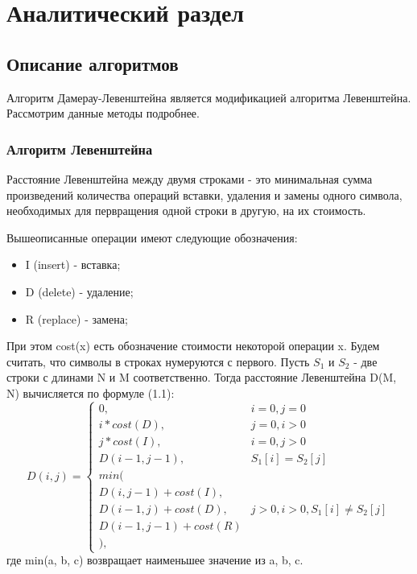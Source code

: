 \chapter{Аналитический раздел}
\label{cha:analysis}

\section{Описание алгоритмов}

Алгоритм Дамерау-Левенштейна является модификацией алгоритма Левенштейна. Рассмотрим данные методы подробнее.

\subsection{Алгоритм Левенштейна}

Расстояние Левенштейна между двумя строками - это минимальная сумма произведений количества операций вставки, удаления и замены одного символа, необходимых для первращения одной строки в другую, на их стоимость.

Вышеописанные операции имеют следующие обозначения:
\begin{itemize}
    \item I (insert) - вставка;
    \item D (delete) - удаление;
    \item R (replace) - замена;
\end{itemize}

При этом cost(x) есть обозначение стоимости некоторой операции x. Будем считать, что символы в строках нумеруются с первого. Пусть $S_{1}$ и $S_{2}$ - две строки с длинами N и M соответственно. Тогда расстояние Левенштейна D(M, N) вычисляется по формуле (1.1):
\begin{equation}
D(i,j) = \left\{ \begin{array}{ll}
 0, & \textrm{$i = 0, j = 0$}\\
 i * cost(D), & \textrm{$j = 0, i > 0$}\\
 j * cost(I), & \textrm{$i = 0, j > 0$}\\
 D(i - 1, j - 1), & \textrm{$S_{1}[i] = S_{2}[j]$}\\
min(\\
D(i,j-1) + cost(I),\\
D(i-1, j) + cost(D), &\textrm{$j > 0, i > 0, S_1[i] \neq S_2[j]$}\\
D(i-1, j-1) + cost(R)\\
),
  \end{array} \right.
\end{equation}
где min(a, b, c) возвращает наименьшее значение из a, b, c.

